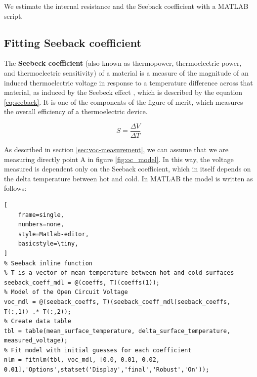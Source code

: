 

We estimate the internal resistance and the Seeback coefficient with a MATLAB script.
\subsection{Fitting Seeback coefficient}

The \textbf{Seebeck coefficient} (also known as thermopower, thermoelectric power, and thermoelectric sensitivity) of a material is a measure of the magnitude of an induced thermoelectric voltage in response to a temperature difference across that material, as induced by the Seebeck effect \cite{seebeckCoefficientWikipedia}, which is described by the equation \ref{eq:seeback}. It is one of the components of the figure of merit, which measures the overall efficiency of a thermoelectric device.

\begin{equation}
    S = \frac{ \Delta V}{\Delta T }
    \label{eq:seeback}
\end{equation}

As described in section \ref{sec:voc-measurement}, we can assume that we are measuring directly point A in figure \ref{fig:oc_model}. In this way, the voltage measured is dependent only on the Seeback coefficient, which in itself depends on the delta temperature between hot and cold. In MATLAB the model is written as follows:

\begin{lstlisting}[
    frame=single,
    numbers=none,
    style=Matlab-editor,
    basicstyle=\tiny,
]
% Seeback inline function
% T is a vector of mean temperature between hot and cold surfaces
seeback_coeff_mdl = @(coeffs, T)(coeffs(1));
% Model of the Open Circuit Voltage
voc_mdl = @(seeback_coeffs, T)(seeback_coeff_mdl(seeback_coeffs, T(:,1)) .* T(:,2));
% Create data table
tbl = table(mean_surface_temperature, delta_surface_temperature, measured_voltage);
% Fit model with initial guesses for each coefficient
nlm = fitnlm(tbl, voc_mdl, [0.0, 0.01, 0.02, 0.01],'Options',statset('Display','final','Robust','On'));
\end{lstlisting}


